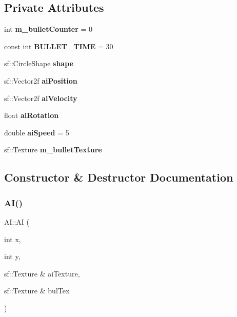 \subsection*{Private Attributes}
\begin{DoxyCompactItemize}
\item 
\mbox{\label{class_a_i_a3c8780b246bc21195a6d3c2b802b1941}} 
int {\bfseries m\+\_\+bullet\+Counter} = 0
\item 
\mbox{\label{class_a_i_ae2090a65abaae9720c3873a8459033f9}} 
const int {\bfseries B\+U\+L\+L\+E\+T\+\_\+\+T\+I\+ME} = 30
\item 
\mbox{\label{class_a_i_aa672ee9afaf3d7c4312ae03bace5a2f4}} 
sf\+::\+Circle\+Shape {\bfseries shape}
\item 
\mbox{\label{class_a_i_acda7a6c7d425af3c14b02e5a5b0b79b9}} 
sf\+::\+Vector2f {\bfseries ai\+Position}
\item 
\mbox{\label{class_a_i_ad3136b568efa57d2319ac7bcc60d8dec}} 
sf\+::\+Vector2f {\bfseries ai\+Velocity}
\item 
\mbox{\label{class_a_i_a4997155c89c95b9d6a2c7d560955c12e}} 
float {\bfseries ai\+Rotation}
\item 
\mbox{\label{class_a_i_aef3870a63b9fb0ee6922733f4c403930}} 
double {\bfseries ai\+Speed} = 5
\item 
\mbox{\label{class_a_i_a3cf613f84b0b2ac7efbeb59bdebba658}} 
sf\+::\+Texture {\bfseries m\+\_\+bullet\+Texture}
\end{DoxyCompactItemize}


\subsection{Constructor \& Destructor Documentation}
\mbox{\label{class_a_i_a1d782247a4ef257300018bca8701d02e}} 
\subsubsection{\texorpdfstring{AI()}{AI()}}
{\footnotesize\ttfamily A\+I\+::\+AI (\begin{DoxyParamCaption}\item[{int}]{x,  }\item[{int}]{y,  }\item[{sf\+::\+Texture \&}]{ai\+Texture,  }\item[{sf\+::\+Texture \&}]{bul\+Tex }\end{DoxyParamCaption})}



